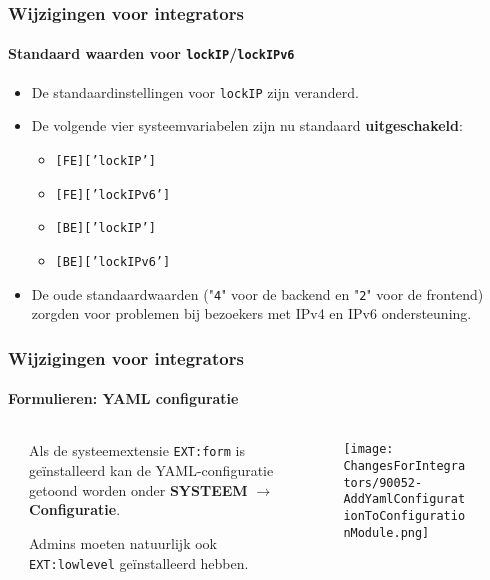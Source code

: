 \begin{frame}[fragile]
	\frametitle{Wijzigingen voor integrators}
	\framesubtitle{Standaard waarden voor \texttt{lockIP}/\texttt{lockIPv6}}

	\lstset{basicstyle=\smaller\ttfamily}

	\begin{itemize}
		\item De standaardinstellingen voor \texttt{lockIP} zijn veranderd.
		\item De volgende vier systeemvariabelen zijn nu standaard \textbf{uitgeschakeld}:

			\begin{itemize}
				\item \texttt{[FE]['lockIP']}
				\item \texttt{[FE]['lockIPv6']}
				\item \texttt{[BE]['lockIP']}
				\item \texttt{[BE]['lockIPv6']}
			\end{itemize}

		\item De oude standaardwaarden ("\texttt{4}" voor de backend en "\texttt{2}" voor de frontend)
			zorgden voor problemen bij bezoekers met IPv4 en IPv6 ondersteuning.

	\end{itemize}

\end{frame}


\begin{frame}[fragile]
	\frametitle{Wijzigingen voor integrators}
	\framesubtitle{Formulieren: YAML configuratie}

	\begin{columns}[T]
		\begin{column}{.04\textwidth}
		\end{column}
		\begin{column}{.38\textwidth}

			Als de systeemextensie \texttt{EXT:form} is geïnstalleerd kan de YAML-configuratie
			getoond worden onder \textbf{SYSTEEM} $\rightarrow$ \textbf{Configuratie}.

			\vspace{0.2cm}

			Admins moeten natuurlijk ook \texttt{EXT:lowlevel} geïnstalleerd hebben.

		\end{column}
		\begin{column}{.58\textwidth}
			\vspace{-0.3cm}
			\begin{figure}
				\texttt{[image: ChangesForIntegrators/90052-AddYamlConfigurationToConfigurationModule.png]}
			\end{figure}
		\end{column}
	\end{columns}

\end{frame}

